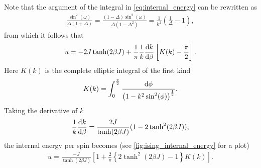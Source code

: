 \documentclass[11pt, a4paper]{report} %
\begin{document}
Note that the argument of the integral in \cref{eq:internal_energy} can be rewritten as
\begin{align}
	\frac{\sin^2(\omega)}{\Delta (1+\Delta)} = \frac{(1 - \Delta) \sin^2(\omega)}{\Delta(1-\Delta^2)} = \frac{1}{k^2}\left(\frac{1}{\Delta} - 1\right),
\end{align}
from which it follows that
\begin{align}
	u = - 2 J \tanh(2\beta J) + \frac{1}{\pi} \frac{1}{k} \frac{\dif k}{\dif \beta} \left[ K(k) - \frac{\pi}{2}\right].
\end{align}
Here \(K(k)\) is the complete elliptic integral of the first kind
\begin{align}
	K(k) = \int_0^{\frac{\pi}{2}} \frac{\dif \phi}{\left(1-k^2 \sin^2(\phi)\right)^{\frac{1}{2}}}.
\end{align}
Taking the derivative of \(k\)
\begin{align}
	\label{eq:k_derivative}
	\frac{1}{k}\frac{\dif k}{\dif \beta} = \frac{2 J}{\tanh(2\beta J)} (1 - 2\tanh^2(2 \beta J)),
\end{align}
the internal energy per spin becomes (see \cref{fig:ising_internal_energy} for a plot)
\begin{align}
	\label{eq:ising_internal_energy}
	u = \frac{-J}{\tanh(2\beta J)} \left[1 + \frac{2}{\pi} \left\{2 \tanh^2(2\beta J) -1 \right\} K(k) \right].
\end{align}
\end{document}
